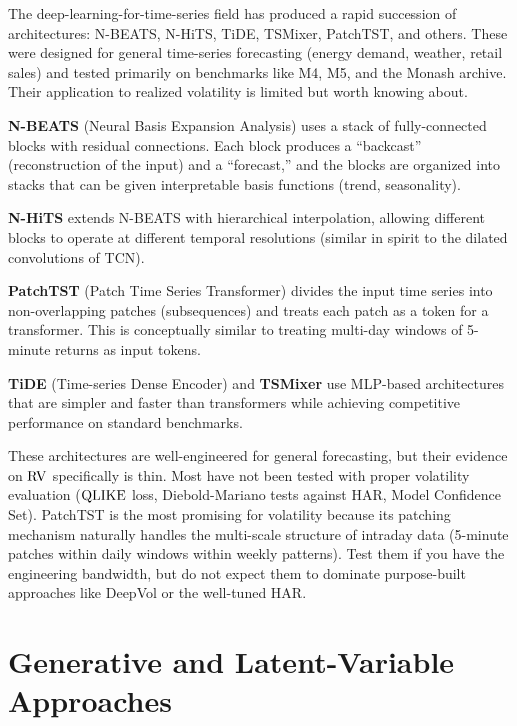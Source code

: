 The deep-learning-for-time-series field has produced a rapid succession of architectures: N-BEATS, N-HiTS, TiDE, TSMixer, PatchTST, and others.
These were designed for general time-series forecasting (energy demand, weather, retail sales) and tested primarily on benchmarks like M4, M5, and the Monash archive.
Their application to realized volatility is limited but worth knowing about.

\textbf{N-BEATS} (Neural Basis Expansion Analysis) uses a stack of fully-connected blocks with residual connections.
Each block produces a ``backcast'' (reconstruction of the input) and a ``forecast,'' and the blocks are organized into stacks that can be given interpretable basis functions (trend, seasonality).

\textbf{N-HiTS} extends N-BEATS with hierarchical interpolation, allowing different blocks to operate at different temporal resolutions (similar in spirit to the dilated convolutions of TCN).

\textbf{PatchTST} (Patch Time Series Transformer) divides the input time series into non-overlapping patches (subsequences) and treats each patch as a token for a transformer.
This is conceptually similar to treating multi-day windows of 5-minute returns as input tokens.

\textbf{TiDE} (Time-series Dense Encoder) and \textbf{TSMixer} use MLP-based architectures that are simpler and faster than transformers while achieving competitive performance on standard benchmarks.

\begin{keyidea}
These architectures are well-engineered for general forecasting, but their evidence on $\operatorname{RV}$ specifically is thin.
Most have not been tested with proper volatility evaluation ($\operatorname{QLIKE}$ loss, Diebold-Mariano tests against HAR, Model Confidence Set).
PatchTST is the most promising for volatility because its patching mechanism naturally handles the multi-scale structure of intraday data (5-minute patches within daily windows within weekly patterns).
Test them if you have the engineering bandwidth, but do not expect them to dominate purpose-built approaches like DeepVol or the well-tuned HAR.
\end{keyidea}


\section{Generative and Latent-Variable Approaches}\label{sec:dl:generative}


